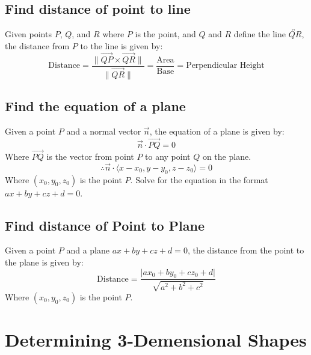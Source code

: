 \documentclass{article}
\begin{document}
\subsection{Find distance of point to line}
Given points $P$, $Q$, and $R$ where $P$ is the point, and $Q$ and $R$ define the line $\overleftrightarrow{QR}$, the distance from $P$ to the line is given by:
\begin{equation}
    \text{Distance} = \frac{\lVert \vec{QP} \times \vec{QR} \rVert}{\lVert \vec{QR} \rVert} = \frac{\text{Area}}{\text{Base}} = \text{Perpendicular Height}
\end{equation}

\subsection{Find the equation of a plane}
Given a point $P$ and a normal vector $\vec{n}$, the equation of a plane is given by:
\begin{equation}
    \vec{n} \cdot \vec{PQ} = 0
\end{equation}
Where $\vec{PQ}$ is the vector from point $P$ to any point $Q$ on the plane. \\
\begin{equation}
    \therefore \vec{n} \cdot \langle x - x_0, y - y_0, z - z_0 \rangle = 0
\end{equation}
Where $(x_0, y_0, z_0)$ is the point $P$.
Solve for the equation in the format $ax + by + cz + d = 0$.

\subsection{Find distance of Point to Plane}
Given a point $P$ and a plane $ax + by + cz + d = 0$, the distance from the point to the plane is given by:
\begin{equation}
    \text{Distance} = \frac{\lvert ax_0 + by_0 + cz_0 + d \rvert}{\sqrt{a^2 + b^2 + c^2}}
\end{equation}
Where $(x_0, y_0, z_0)$ is the point $P$.

\newpage

\section{Determining 3-Demensional Shapes}
\end{document}
